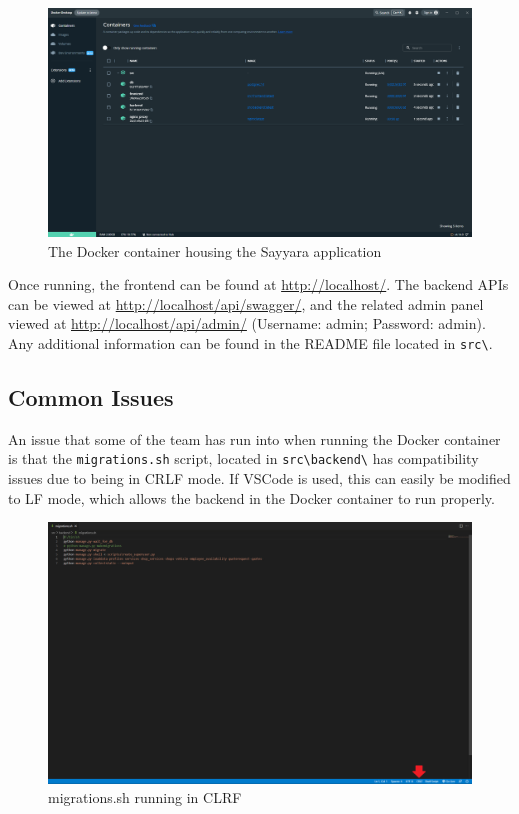 \documentclass{article}
\begin{document}
\begin{figure}[H]
    \includegraphics[width=1\textwidth]{images/docker.png}
    \caption{The Docker container housing the Sayyara application}
    \label{fig:my_label}
\end{figure}

\noindent Once running, the frontend can be found at \href{http://localhost/}{http://localhost/}. The backend APIs can be viewed at \href{http://localhost/api/swagger/}{http://localhost/api/swagger/}, and the related admin panel viewed at \href{http://localhost/api/admin/}{http://localhost/api/admin/} (Username: admin; Password: admin). Any additional information can be found in the README file located in \texttt{src\textbackslash}.

\subsection{Common Issues}

An issue that some of the team has run into when running the Docker container is that the \texttt{migrations.sh} script, located in \texttt{src\textbackslash backend\textbackslash} has compatibility issues due to being in CRLF mode. If VSCode is used, this can easily be modified to LF mode, which allows the backend in the Docker container to run properly.

\begin{figure}[H]
    \includegraphics[width=1\textwidth]{images/crlf.png}
    \caption{migrations.sh running in CLRF}
\end{figure}
\end{document}
